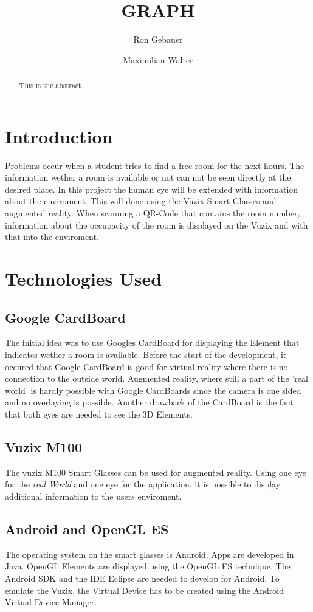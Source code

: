 \documentclass[]{article}
\title{GRAPH}
\author{Ron Gebauer \and Maximilian Walter}
\begin{document}
\maketitle

\begin{abstract}
This is the abstract.
\end{abstract}
\begin{multicols}{2}
\section{Introduction}
Problems occur when a student tries to find a free room for the next hours. The information wether a room is available or not can not be seen directly at the desired place. In this project the human eye will be extended with information about the enviroment. This will done using the Vuzix Smart Glasses and augmented reality. When scanning a QR-Code that contains the room number, information about the occupacity of the room is displayed on the Vuzix and with that into the enviroment. 
\section{Technologies Used}
\subsection{Google CardBoard}
The initial idea was to use Googles CardBoard for displaying the Element that indicates wether a room is available. Before the start of the development, it occured that Google CardBoard is good for virtual reality where there is no connection to the outside world. Augmented reality, where still a part of the 'real world' is hardly possible with Google CardBoards since the camera is one sided and no overlaying is possible.
\newline
Another drawback of the CardBoard is the fact that both eyes are needed to see the 3D Elements.   
\subsection{Vuzix M100}
The vuzix M100 Smart Glasses can be used for augmented reality. Using one eye for the \emph{real World} and one eye for the application, it is possible to display additional information to the users enviroment.
\subsection{Android and OpenGL ES}
The operating system on the smart glasses is Android. Apps are developed in Java. OpenGL Elements are displayed using the OpenGL ES technique. 
\newline
The Android SDK and the IDE Eclipse are needed to develop for Android. To emulate the Vuzix, the Virtual Device has to be created using the Android Virtual Device Manager. 

\end{multicols}
\end{document}
